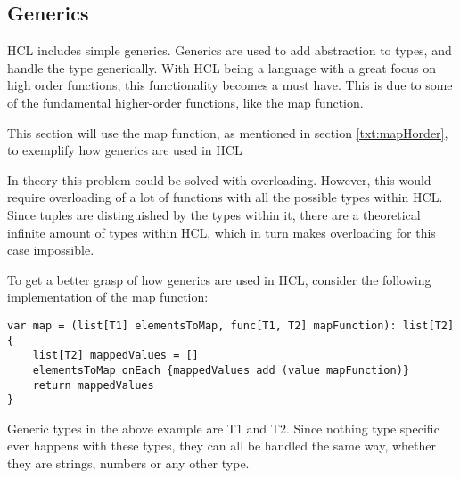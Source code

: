 \subsection{Generics}
HCL includes simple generics.
Generics are used to add abstraction to types, and handle the type generically.
With HCL being a language with a great focus on high order functions, this functionality becomes a must have.
This is due to some of the fundamental higher-order functions, like the map function.

This section will use the map function, as mentioned in section \ref{txt:mapHorder}, to exemplify how generics are used in HCL

In theory this problem could be solved with overloading. 
However, this would require overloading of a lot of functions with all the possible types within HCL. 
Since tuples are distinguished by the types within it, there are a theoretical infinite amount of types within HCL, which in turn makes overloading for this case impossible.

To get a better grasp of how generics are used in HCL, consider the following implementation of the map function:
\begin{lstlisting}[language=HCL,label=lis:hclTypeDcls,firstnumber=1]
var map = (list[T1] elementsToMap, func[T1, T2] mapFunction): list[T2] {
	list[T2] mappedValues = []
	elementsToMap onEach {mappedValues add (value mapFunction)}
	return mappedValues
}
\end{lstlisting}

Generic types in the above example are T1 and T2. 
Since nothing type specific ever happens with these types, they can all be handled the same way, whether they are strings, numbers or any other type.

